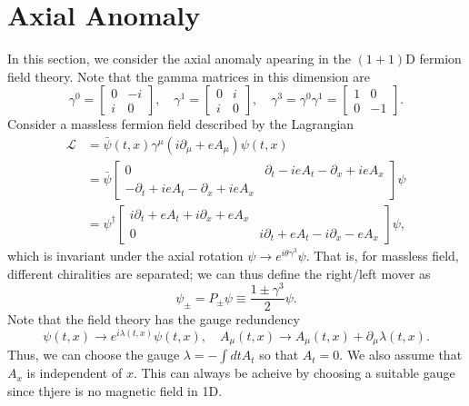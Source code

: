 \documentclass[aps,prb,superscriptaddress,nofootinbib]{revtex4}
\begin{document}
\section{Axial Anomaly}
In this section, we consider the axial anomaly apearing in the $(1+1)$D fermion field theory.
Note that the gamma matrices in this dimension are
\begin{equation}
	\gamma^0 = \begin{bmatrix}
		0 & -i \\ i & 0
	\end{bmatrix} ,\quad
	\gamma^1 = \begin{bmatrix}
		0 & i \\ i & 0
	\end{bmatrix},\quad
	\gamma^3 = \gamma^0 \gamma^1 = \begin{bmatrix}
		1 & 0 \\ 0 & -1
	\end{bmatrix}.
\end{equation}
Consider a massless fermion field described by the Lagrangian 
\begin{equation}
\begin{aligned}
	\mathcal L &= \bar\psi(t,x) \gamma^\mu(i\partial_\mu+eA_\mu)\psi(t,x) \\
	&= \bar\psi \begin{bmatrix}
		0 & \partial_t -ieA_t - \partial_x +ieA_x \\
		-\partial_t +ieA_t - \partial_x +ieA_x
	\end{bmatrix} \psi \\
	&= \psi^\dagger \begin{bmatrix}
		i\partial_t +eA_t +i \partial_x + eA_x \\
		0 & i\partial_t +eA_t - i\partial_x - eA_x
	\end{bmatrix} \psi,
\end{aligned}
\end{equation}
which is invariant under the axial rotation $\psi \rightarrow e^{i\theta\gamma^3}\psi$.
That is, for massless field, different chiralities are separated; we can thus define the right/left mover as
\begin{equation}
	\psi_\pm = P_\pm \psi \equiv \frac{1 \pm \gamma^3}{2}\psi.
\end{equation}
Note that the field theory has the gauge redundency
\begin{equation}
	\psi(t,x) \rightarrow e^{i\lambda(t,x)}\psi(t,x),\quad
	A_\mu(t,x) \rightarrow A_\mu(t,x)+\partial_\mu \lambda(t,x).
\end{equation}
Thus, we can choose the gauge $\lambda = -\int dt A_t$ so that $A_t=0$.
We also assume that $A_x$ is independent of $x$.
This can always be acheive by choosing a suitable gauge since thjere is no magnetic field in 1D.
\end{document}
